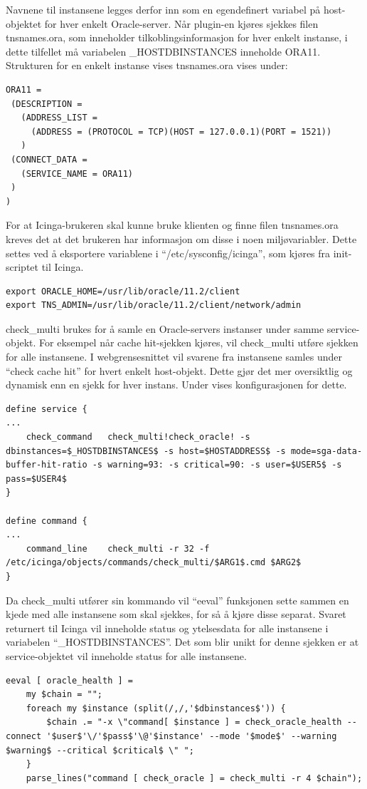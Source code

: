 Navnene til instansene legges derfor inn som en egendefinert variabel på host-objektet for hver enkelt Oracle-server. Når plugin-en kjøres sjekkes filen tnsnames.ora, som inneholder tilkoblingsinformasjon for hver enkelt instanse, i dette tilfellet må variabelen \_HOSTDBINSTANCES inneholde ORA11. Strukturen for en enkelt instanse vises tnsnames.ora vises under:
\begin{lstlisting}[style=example]
ORA11 =
 (DESCRIPTION = 
   (ADDRESS_LIST =
     (ADDRESS = (PROTOCOL = TCP)(HOST = 127.0.0.1)(PORT = 1521))
   )
 (CONNECT_DATA =
   (SERVICE_NAME = ORA11)
 )
)
\end{lstlisting}

For at Icinga-brukeren skal kunne bruke klienten og finne filen tnsnames.ora kreves det at det brukeren har informasjon om disse i noen miljøvariabler. Dette settes ved å eksportere variablene i ``/etc/sysconfig/icinga'', som kjøres fra init-scriptet til Icinga.
\begin{lstlisting}[style=example]
export ORACLE_HOME=/usr/lib/oracle/11.2/client
export TNS_ADMIN=/usr/lib/oracle/11.2/client/network/admin
\end{lstlisting}

check\_multi brukes for å samle en Oracle-servers instanser under samme service-objekt. For eksempel når cache hit-sjekken kjøres, vil check\_multi utføre sjekken for alle instansene. I webgrensesnittet vil svarene fra instansene samles under ``check cache hit'' for hvert enkelt host-objekt. Dette gjør det mer oversiktlig og dynamisk enn en sjekk for hver instans. Under vises konfigurasjonen for dette.

\begin{lstlisting}[style=example]
define service {
...
    check_command	check_multi!check_oracle! -s dbinstances=$_HOSTDBINSTANCES$ -s host=$HOSTADDRESS$ -s mode=sga-data-buffer-hit-ratio -s warning=93: -s critical=90: -s user=$USER5$ -s pass=$USER4$
}

define command {
...
	command_line	check_multi -r 32 -f /etc/icinga/objects/commands/check_multi/$ARG1$.cmd $ARG2$
}
\end{lstlisting}
Da check\_multi utfører sin kommando vil ``eeval'' funksjonen sette sammen en kjede med alle instansene som skal sjekkes, for så å kjøre disse separat. Svaret returnert til Icinga vil inneholde status og ytelsesdata for alle instansene i variabelen ``\_HOSTDBINSTANCES''. Det som blir unikt for denne sjekken er at service-objektet vil inneholde status for alle instansene.
\begin{lstlisting}[style=example]
eeval [ oracle_health ] =
    my $chain = "";
    foreach my $instance (split(/,/,'$dbinstances$')) {
        $chain .= "-x \"command[ $instance ] = check_oracle_health --connect '$user$'\/'$pass$'\@'$instance' --mode '$mode$' --warning $warning$ --critical $critical$ \" ";
    }
    parse_lines("command [ check_oracle ] = check_multi -r 4 $chain");
\end{lstlisting}

